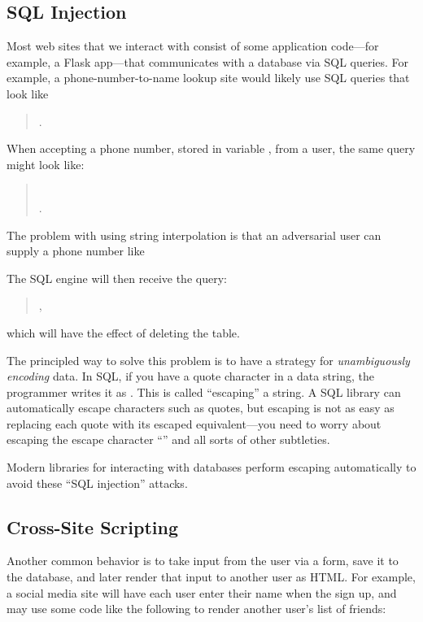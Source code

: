 \subsection{SQL Injection}
Most web sites that we interact with consist of some application code---for
example, a Flask app---that communicates with a database via SQL queries. For
example, a phone-number-to-name lookup site would likely use SQL queries that
look like 
\begin{quote}
	.
\end{quote}
When accepting a phone number, stored in variable , from a user,
the same query might look like:
\begin{quote}
	\\
	.
\end{quote}
The problem with using string interpolation is that an adversarial user
can supply a phone number like
\begin{quote}
\end{quote}
The SQL engine will then receive the query:
\begin{quote}
	,
\end{quote}
which will have the effect of deleting the  table.

The principled way to solve this problem is to have a strategy for
\emph{unambiguously encoding} data.
In SQL, if you have a quote character  in a data string, the programmer
writes it as \ttt{\"}. This is called ``escaping'' a string.
A SQL library can automatically escape characters such as quotes,
but escaping is not as easy as replacing each quote with its escaped
equivalent---you need to worry about escaping the escape character ``\ttt{\\}''
and all sorts of other subtleties.

Modern libraries for interacting with databases perform escaping
automatically to avoid these ``SQL injection'' attacks.


\subsection{Cross-Site Scripting}
Another common behavior is to take input from the user via a form, save it to the database, and later render that input to another user as HTML. For example, a social media site will have each user enter their name when the sign up, and may use some code like the following to render another user's list of friends:

